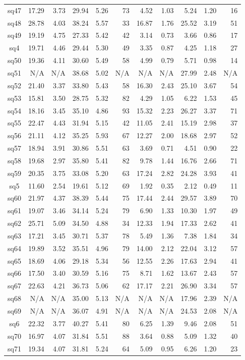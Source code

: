 {\begin{longtable}{@{}cr@{\hspace{1em}}r@{\hspace{1em}}r@{\hspace{1em}}r@{\hspace{1em}}r@{\hspace{2em}}r@{\hspace{1em}}r@{\hspace{1em}}r@{\hspace{1em}}r@{\hspace{1em}}r@{}}
sq47&17.29&3.73&29.94&5.26&73&4.52&1.03&5.24&1.20&16\\
sq48&28.78&4.03&38.24&5.57&33&16.87&1.76&25.52&3.19&51\\
sq49&19.19&4.75&27.33&5.42&42&3.14&0.73&3.66&0.86&17\\
sq4&19.71&4.46&29.44&5.30&49&3.35&0.87&4.25&1.18&27\\
sq50&19.36&4.11&30.60&5.49&58&4.99&0.79&5.71&0.98&14\\
sq51&N/A&N/A&38.68&5.02&N/A&N/A&N/A&27.99&2.48&N/A\\
sq52&21.40&3.37&33.80&5.43&58&16.30&2.43&25.10&3.67&54\\
sq53&15.81&3.50&28.75&5.32&82&4.29&1.05&6.22&1.53&45\\
sq54&18.16&3.45&35.10&4.86&93&15.32&2.23&26.27&3.37&71\\
sq55&22.47&4.43&31.94&5.15&42&11.05&2.41&15.19&2.98&37\\
sq56&21.11&4.12&35.25&5.93&67&12.27&2.00&18.68&2.97&52\\
sq57&18.94&3.91&30.86&5.51&63&3.69&0.71&4.51&0.90&22\\
sq58&19.68&2.97&35.80&5.41&82&9.78&1.44&16.76&2.66&71\\
sq59&20.35&3.75&33.08&5.20&63&17.24&2.82&24.28&3.93&41\\
sq5&11.60&2.54&19.61&5.12&69&1.92&0.35&2.12&0.49&11\\
sq60&21.97&4.37&38.39&5.44&75&17.44&2.44&29.57&3.89&70\\
sq61&19.07&3.46&34.14&5.24&79&6.90&1.33&10.30&1.97&49\\
sq62&25.71&5.09&34.50&4.88&34&12.33&1.94&17.33&2.62&41\\
sq63&17.21&3.45&30.71&5.37&78&5.49&1.36&7.38&1.84&34\\
sq64&19.89&3.52&35.51&4.96&79&14.00&2.12&22.04&3.12&57\\
sq65&18.69&4.06&29.18&5.34&56&12.55&2.26&17.63&2.94&41\\
sq66&17.50&3.40&30.59&5.16&75&8.71&1.62&13.67&2.43&57\\
sq67&22.63&4.21&36.73&5.06&62&17.17&2.21&26.90&3.34&57\\
sq68&N/A&N/A&35.00&5.13&N/A&N/A&N/A&17.96&2.39&N/A\\
sq69&N/A&N/A&36.07&4.91&N/A&N/A&N/A&24.53&2.08&N/A\\
sq6&22.32&3.77&40.27&5.41&80&6.25&1.39&9.46&2.08&51\\
sq70&16.97&4.07&31.84&5.51&88&3.64&0.88&5.09&1.32&40\\
sq71&19.34&4.07&31.81&5.24&64&5.09&0.95&6.26&1.20&23\\

\end{longtable}}
